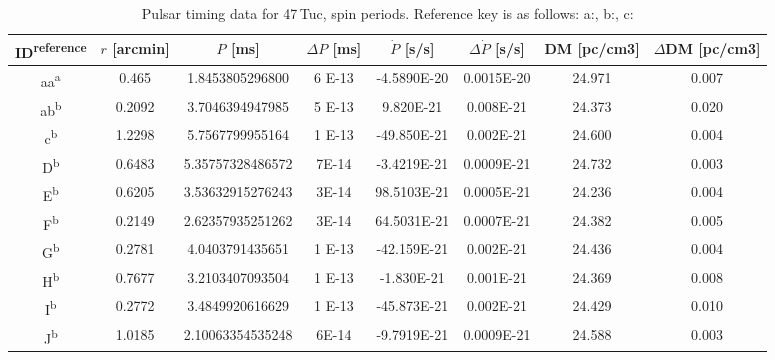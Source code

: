 
\begin{table}
	\centering
	\caption{Pulsar timing data for 47\,Tuc, spin periods. Reference key is as follows:
		a:\citet{Freire2018}, b:\citet{Freire2017}, c:\citet{Ridolfi2016}}

	\begin{tabular}{c c c c c c c c}
		\hline

		ID\textsuperscript{reference} & $r$ [arcmin] & $P$ [ms]         & $\Delta P$ [ms] & $\dot{P}$ [s/s]     & $\Delta \dot{P}$ [s/s] & DM [pc/cm3] & $\Delta$DM [pc/cm3] \\
		\hline
		aa\textsuperscript{a}         & 0.465        & 1.8453805296800  & \num{6 E-13}    & \num{-4.5890E-20}   & \num{0.0015E-20}       & 24.971      & 0.007               \\
		ab\textsuperscript{b}         & 0.2092       & 3.7046394947985  & \num{5 E-13}    & \num{9.820E-21}     & \num{0.008E-21}        & 24.373      & 0.020               \\
		c\textsuperscript{b}          & 1.2298       & 5.7567799955164  & \num{1 E-13}    & \num{-49.850E-21}   & \num{0.002E-21}        & 24.600      & 0.004               \\
		D\textsuperscript{b}          & 0.6483       & 5.35757328486572 & \num{7E-14}     & \num{-3.4219E-21}   & \num{0.0009E-21}       & 24.732      & 0.003               \\
		E\textsuperscript{b}          & 0.6205       & 3.53632915276243 & \num{3E-14}     & \num{98.5103E-21}   & \num{0.0005E-21}       & 24.236      & 0.004               \\
		F\textsuperscript{b}          & 0.2149       & 2.62357935251262 & \num{3E-14}     & \num{64.5031E-21}   & \num{0.0007E-21}       & 24.382      & 0.005               \\
		G\textsuperscript{b}          & 0.2781       & 4.0403791435651  & \num{1 E-13}    & \num{-42.159E-21}   & \num{0.002E-21}        & 24.436      & 0.004               \\
		H\textsuperscript{b}          & 0.7677       & 3.2103407093504  & \num{1 E-13}    & \num{-1.830E-21}    & \num{0.001E-21}        & 24.369      & 0.008               \\
		I\textsuperscript{b}          & 0.2772       & 3.4849920616629  & \num{1 E-13}    & \num{-45.873E-21}   & \num{0.002E-21}        & 24.429      & 0.010               \\
		J\textsuperscript{b}          & 1.0185       & 2.10063354535248 & \num{6E-14}     & \num{-9.7919E-21}   & \num{0.0009E-21}       & 24.588      & 0.003               \\

\end{tabular}
\end{table}
